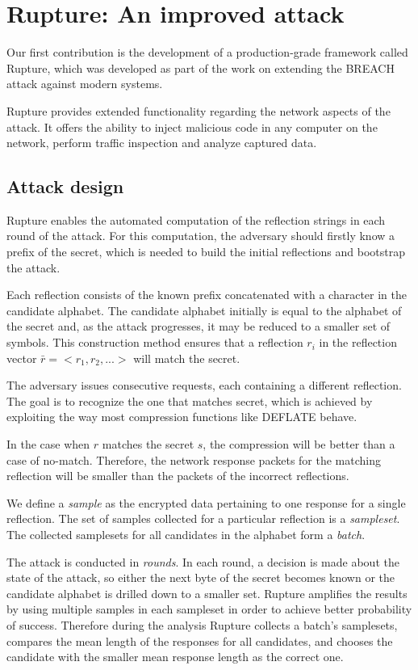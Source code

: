 \section{Rupture: An improved attack}\label{subsec:rupture}
Our first contribution is the development of a production-grade framework called
Rupture, which was developed as part of the work on extending the BREACH attack
against modern systems.

Rupture provides extended functionality regarding the network aspects of the
attack. It offers the ability to inject malicious code in any computer on the
network, perform traffic inspection and analyze captured data.

\subsection{Attack design}\label{subsec:rupture_attack_design}

Rupture enables the automated computation of the reflection strings in each
round of the attack. For this computation, the adversary should firstly know a
prefix of the secret, which is needed to build the initial reflections and
bootstrap the attack.

Each reflection consists of the known prefix concatenated with a character in
the candidate alphabet. The candidate alphabet initially is equal to the
alphabet of the secret and, as the attack progresses, it may be reduced to a
smaller set of symbols. This construction method ensures that a reflection $r_i$
in the reflection vector $\bar{r} = <r_1, r_2, ...>$ will match the secret.

The adversary issues consecutive requests, each containing a different
reflection. The goal is to recognize the one that matches secret, which is
achieved by exploiting the way most compression functions like DEFLATE behave.

In the case when $r$ matches the secret $s$, the compression will be better than
a case of no-match. Therefore, the network response packets for the matching
reflection will be smaller than the packets of the incorrect reflections.

We define a \textit{sample} as the encrypted data pertaining to one response for
a single reflection. The set of samples collected for a particular reflection is a
\textit{sampleset}. The collected samplesets for all candidates in the alphabet
form a \textit{batch}.

The attack is conducted in \textit{rounds}. In each round, a decision is made
about the state of the attack, so either the next byte of the secret becomes
known or the candidate alphabet is drilled down to a smaller set. Rupture
amplifies the results by using multiple samples in each
sampleset in order to achieve better probability of success. Therefore during the
analysis Rupture collects a batch's samplesets, compares the mean length of the
responses for all candidates, and chooses the candidate with the smaller mean
response length as the correct one.

